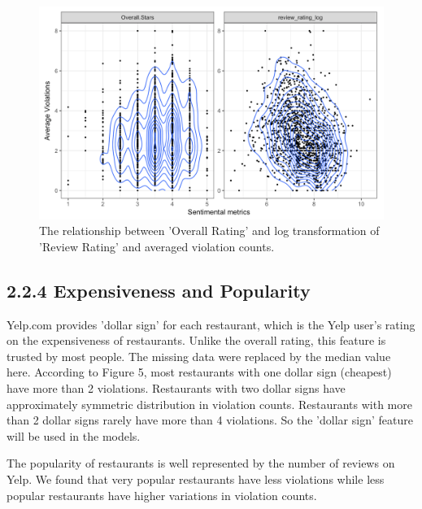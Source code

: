 \documentclass[letterpaper, 11 pt, conference]{ieeeconf}
\begin{document}
\begin{figure}[h]
	\centering
    \includegraphics[scale = 0.3]{ratings}
    \caption{The relationship between 'Overall Rating' and log transformation of 'Review Rating' and averaged violation counts. }
\end{figure}

\subsection*{2.2.4 Expensiveness and Popularity}

Yelp.com provides 'dollar sign' for each restaurant, which is the Yelp user's rating on the expensiveness of restaurants. Unlike the overall rating, this feature is trusted by most people. The missing data were replaced by the median value here. According to Figure 5, most restaurants with one dollar sign (cheapest) have more than 2 violations. Restaurants with two dollar signs have approximately symmetric distribution in violation counts. Restaurants with more than 2 dollar signs rarely have more than 4 violations. So the 'dollar sign' feature will be used in the models.

The popularity of restaurants is well represented by the number of reviews on Yelp. We found that very popular restaurants have less violations while less popular restaurants have higher variations in violation counts.
\end{document}
